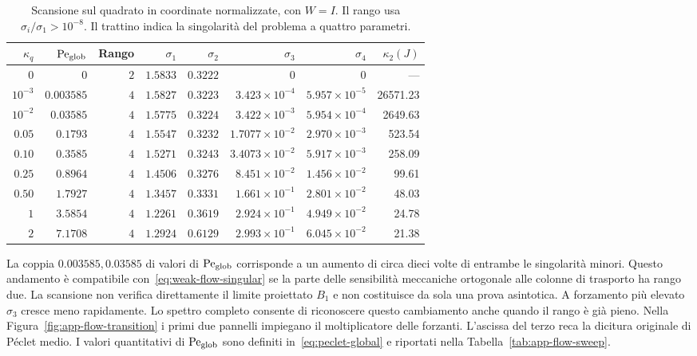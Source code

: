 \begin{table}[H]
\centering
\caption{Scansione sul quadrato in coordinate normalizzate, con $W=I$. Il rango usa $\sigma_i/\sigma_1>10^{-8}$. Il trattino indica la singolarità del problema a quattro parametri.}
\label{tab:app-flow-sweep}\label{tab:app-flow-conditioning}
\small
\begin{tabular}{@{}rrrrrrrr@{}}
\toprule
$\kappa_q$ & $\mathrm{Pe}_{\rm glob}$ & Rango & $\sigma_1$ & $\sigma_2$ & $\sigma_3$ & $\sigma_4$ & $\kappa_2(J)$\\
\midrule
$0$ & $0$ & $2$ & $1.5833$ & $0.3222$ & $0$ & $0$ & ---\\
$10^{-3}$ & $0.003585$ & $4$ & $1.5827$ & $0.3223$ & $3.423\times10^{-4}$ & $5.957\times10^{-5}$ & 26571.23\\
$10^{-2}$ & $0.03585$ & $4$ & $1.5775$ & $0.3224$ & $3.422\times10^{-3}$ & $5.954\times10^{-4}$ & 2649.63\\
$0.05$ & $0.1793$ & $4$ & $1.5547$ & $0.3232$ & $1.7077\times10^{-2}$ & $2.970\times10^{-3}$ & 523.54\\
$0.10$ & $0.3585$ & $4$ & $1.5271$ & $0.3243$ & $3.4073\times10^{-2}$ & $5.917\times10^{-3}$ & 258.09\\
$0.25$ & $0.8964$ & $4$ & $1.4506$ & $0.3276$ & $8.451\times10^{-2}$ & $1.456\times10^{-2}$ & 99.61\\
$0.50$ & $1.7927$ & $4$ & $1.3457$ & $0.3331$ & $1.661\times10^{-1}$ & $2.801\times10^{-2}$ & 48.03\\
$1$ & $3.5854$ & $4$ & $1.2261$ & $0.3619$ & $2.924\times10^{-1}$ & $4.949\times10^{-2}$ & 24.78\\
$2$ & $7.1708$ & $4$ & $1.2924$ & $0.6129$ & $2.993\times10^{-1}$ & $6.045\times10^{-2}$ & 21.38\\
\bottomrule
\end{tabular}
\end{table}

La coppia $0.003585,0.03585$ di valori di $\mathrm{Pe}_{\rm glob}$ corrisponde a un aumento di circa dieci volte di entrambe le singolarità minori. Questo andamento è compatibile con~\eqref{eq:weak-flow-singular} se la parte delle sensibilità meccaniche ortogonale alle colonne di trasporto ha rango due. La scansione non verifica direttamente il limite proiettato $B_1$ e non costituisce da sola una prova asintotica. A forzamento più elevato $\sigma_3$ cresce meno rapidamente. Lo spettro completo consente di riconoscere questo cambiamento anche quando il rango è già pieno. Nella Figura~\ref{fig:app-flow-transition} i primi due pannelli impiegano il moltiplicatore delle forzanti. L'ascissa del terzo reca la dicitura originale di Péclet medio. I valori quantitativi di $\mathrm{Pe}_{\rm glob}$ sono definiti in~\eqref{eq:peclet-global} e riportati nella Tabella~\ref{tab:app-flow-sweep}.


